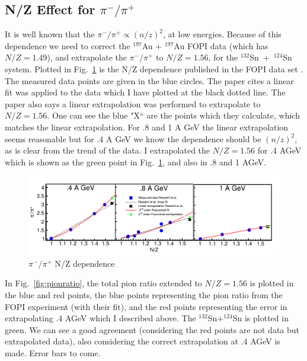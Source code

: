 \documentclass[12pt, letterpaper, twoside]{article}
\begin{document}
\subsection{N/Z Effect for $\pi^-/\pi^+$}
It is well known that the $\pi^-/\pi^+ \propto (n/z)^2$, at low energies. Because of this dependence we need to correct the ${}^{197}$Au + ${}^{197}$Au FOPI data (which has $N/Z= 1.49$), and extrapolate the  $\pi^-/\pi^+$ to $N/Z=1.56$, for the ${}^{132}$Sn~+~${}^{124}$Sn system. Plotted in Fig.~\ref{fig:nzdepend} is the N/Z dependence published in the FOPI data set \cite{fopi}. The measured data points are given in the blue circles. The paper cites a linear fit was applied to the data which I have plotted at the black dotted line. The paper also says a linear extrapolation was performed to extrapolate to $N/Z=1.56$. One can see the blue "X`` are the points which they calculate, which matches the linear extrapolation. For .8 and 1 A GeV the linear extrapolation seems reasonable but for .4 A GeV we know the dependence should be $(n/z)^2$, as is clear from the trend of the data. I extrapolated the $N/Z=1.56$ for .4 AGeV which is shown as the green point in Fig.~\ref{fig:nzdepend}, and also in .8 and 1 AGeV. 


\begin{figure}[!hbt]
\centering
\includegraphics[width=\textwidth]{NZDependence.png}
\caption{$\pi^-/\pi^+$ N/Z dependence }
\label{fig:nzdepend}
\end{figure}
 
 In Fig.~\ref{fig:pionratio}, the total pion ratio extended to $N/Z=1.56$ is plotted in the blue and red points, the blue points representing the pion ratio from the FOPI experiment (with their fit), and the red points representing the error in extrapolating .4 AGeV which I described above. The ${}^{132}$Sn+${}^{124}$Sn is plotted in green. We can see a good agreement (considering the red points are not data but extrapolated data), also considering the correct extrapolation at .4 AGeV is made. Error bars to come. 
 
\end{document}
